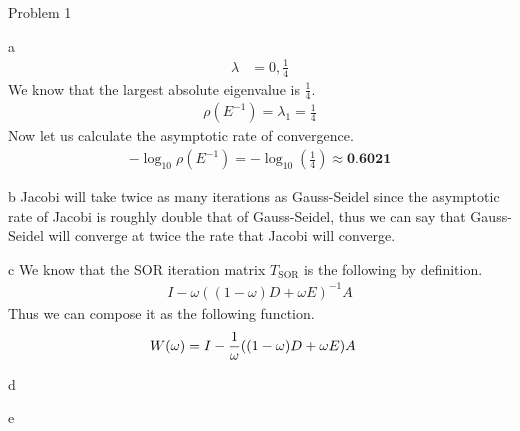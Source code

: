 \begin{section}{Problem 1}
\begin{solution}{a}
\begin{align*}
            \lambda &= 0, \frac{1}{4}
        \end{align*}
        We know that the largest absolute eigenvalue is $\frac{1}{4}$.
        \begin{align*}
            \rho \left( E^{-1} \right) = \lambda_1 = \frac{1}{4}
        \end{align*}
        Now let us calculate the asymptotic rate of convergence.
        \begin{align*}
            - \log_{10} \rho \left( E^{-1} \right) = - \log_{10} \left( \frac{1}{4} \right) \approx \textbf{0.6021}
        \end{align*}
    \end{solution}

    \newpage

    \begin{solution}{b}
        Jacobi will take twice as many iterations as Gauss-Seidel since the asymptotic rate of Jacobi is roughly double that of Gauss-Seidel, thus we can say that Gauss-Seidel will converge at twice the rate that Jacobi will converge. 
    \end{solution}

    \newpage

    \begin{solution}{c}
        We know that the SOR iteration matrix $T_\text{SOR}$ is the following by definition.
        \begin{align*}
            I - \omega ((1 - \omega)D + \omega E)^{-1} A
        \end{align*}
        Thus we can compose it as the following function.
        \begin{align*}
            \boldmath{W}(\omega) &= I - \frac{1}{\omega} ((1 - \omega)D + \omega E) A
        \end{align*}
    \end{solution}

    \newpage

    \begin{solution}{d}
    \end{solution}

    \newpage 

    \begin{solution}{e}
    \end{solution}

\end{section}